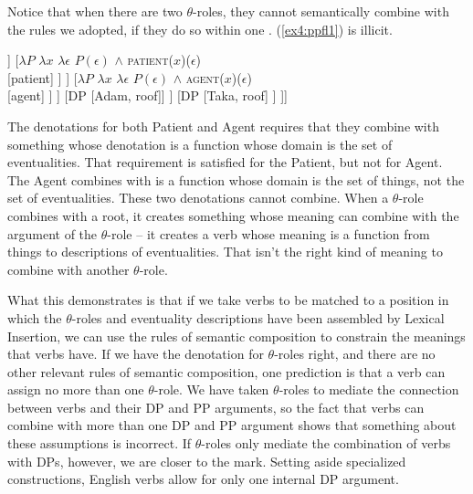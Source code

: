 Notice that when there are two $\theta$-roles, they cannot semantically combine with the rules we adopted, if they do so within one . (\ref{ex4:ppfl1}) is illicit.
\begin{exe}
	\raggedright
	\ex \label{ex4:ppfl1}
	\hspace*{-25pt}
	\small
	\begin{forest}
	[VP[\ibar{V}
		[\ibar{V}
			[??\\ \obar{V}
				[$\lambda x$ $\lambda \epsilon$ \textsc{visit}($\epsilon$) $\wedge$ \textsc{patient}($x$)($\epsilon$)\\ \obar{V} 
					[$\lambda \epsilon$ \textsc{visit}($\epsilon$)\\ \obar{V} [$\surd$visit] ]
					[$\lambda P$ $\lambda x$ $\lambda \epsilon$ $P(\epsilon)$ $\wedge$ \textsc{patient}($x$)($\epsilon$)\\  [patient] ]
				]
				[$\lambda P$ $\lambda x$ $\lambda \epsilon$ $P(\epsilon)$ $\wedge$ \textsc{agent}($x$)($\epsilon$) \\  [agent] ]
			 ]
			[DP [Adam, roof]]
		 ]
		[DP [Taka, roof] ]
	]]
	\end{forest}
\end{exe}
The denotations for both Patient and Agent requires that they combine with something whose denotation is a function whose domain is the set of eventualities. That requirement is satisfied for the Patient, but not for Agent. The  Agent combines with is a function whose domain is the set of things, not the set of eventualities. These two denotations cannot combine. When a $\theta$-role combines with a root, it creates something whose meaning can combine with the argument of the $\theta$-role -- it creates a verb whose meaning is a function from things to descriptions of eventualities. That isn't the right kind of meaning to combine with another $\theta$-role.

What this demonstrates is that if we take verbs to be matched to a  position in which the $\theta$-roles and eventuality descriptions have been assembled by Lexical Insertion, we can use the rules of semantic composition to constrain the meanings that verbs have. If we have the denotation for $\theta$-roles right, and there are no other relevant rules of semantic composition, one prediction is that a verb can assign no more than one $\theta$-role. We have taken $\theta$-roles to mediate the connection between verbs and their DP and PP arguments, so the fact that verbs can combine with more than one DP and PP argument shows that something about these assumptions is incorrect. If $\theta$-roles only mediate the combination of verbs with DPs, however, we are closer to the mark. Setting aside specialized constructions, English verbs allow for only one internal DP argument.%
%

